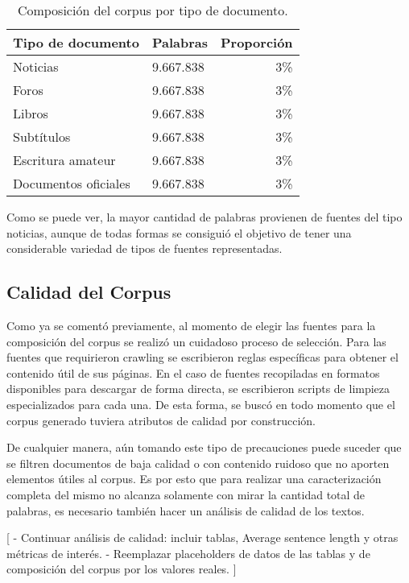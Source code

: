 \begin{table*}[t]
    \centering
    \begin{tabular}{llr}
        \hline
        Tipo de documento & Palabras & Proporción\\
        \hline
        Noticias & 9.667.838 & 3\%\\
        Foros & 9.667.838 & 3\%\\
        Libros & 9.667.838 & 3\%\\
        Subtítulos & 9.667.838 & 3\%\\
        Escritura amateur & 9.667.838 & 3\%\\
        Documentos oficiales & 9.667.838 & 3\%\\
        \hline
    \end{tabular}
    \caption{Composición del corpus por tipo de documento.}
    \label{table:corpus_doc_type}
\end{table*}

Como se puede ver, la mayor cantidad de palabras provienen de fuentes del tipo noticias,
aunque de todas formas se consiguió el objetivo de tener una considerable variedad de
tipos de fuentes representadas.

\subsection{Calidad del Corpus}

Como ya se comentó previamente, al momento de elegir las fuentes para la composición
del corpus se realizó un cuidadoso proceso de selección. Para las fuentes que requirieron
crawling se escribieron reglas específicas para obtener el contenido útil de sus páginas. En
el caso de fuentes recopiladas en formatos disponibles para descargar de forma directa, se
escribieron scripts de limpieza especializados para cada una. De esta forma, se buscó en
todo momento que el corpus generado tuviera atributos de calidad por construcción.

De cualquier manera, aún tomando este tipo de precauciones puede suceder que se filtren
documentos de baja calidad o con contenido ruidoso que no aporten elementos útiles al
corpus. Es por esto que para realizar una caracterización completa del mismo no alcanza
solamente con mirar la cantidad total de palabras, es necesario también hacer
un análisis de calidad de los textos.

[
    - Continuar análisis de calidad: incluir tablas, Average sentence length y otras métricas de interés.
    - Reemplazar placeholders de datos de las tablas y de composición del corpus por los valores reales.
]
